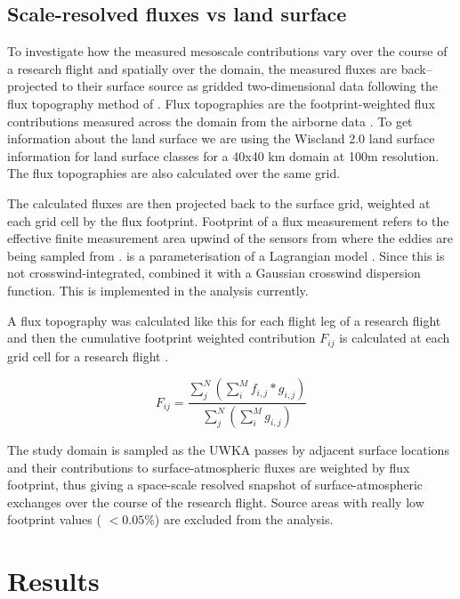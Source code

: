 \documentclass[draft]{agujournal2019}
\begin{document}
\subsection{Scale-resolved fluxes vs land surface}

To investigate how the measured mesoscale contributions vary over the course of a research flight and spatially over the domain,  the measured fluxes are back–projected to their surface source  as gridded two-dimensional data following the flux topography method of . Flux topographies are the footprint-weighted flux contributions measured across the domain from the airborne data \cite{amiro_footprint_1998}. To get information about the land surface we are using the Wiscland 2.0 land surface information for land surface classes for a 40x40 km domain at 100m resolution. The flux topographies are also calculated over the same grid.

The calculated fluxes are then projected back to the surface grid, weighted at each grid cell by the flux footprint. Footprint of a flux measurement refers to the effective finite measurement area upwind of the sensors from where the eddies are being sampled from \cite{foken_aspects_2006}.  is a parameterisation of a Lagrangian model \cite{kljun_three-dimensional_2002}. Since this is not crosswind-integrated,  combined it with a Gaussian crosswind dispersion function. This is implemented in the analysis currently.

A flux topography was calculated like this for each flight leg of a research flight and then the cumulative footprint weighted contribution $F_{ij}$ is calculated at each grid cell for a research flight \cite{kohnert_strong_2017}. 

 \begin{equation}
F_{ij} = \frac{\sum_{j}^{N}(\sum_{i}^{M}f_{i,j}*g_{i,j})}{\sum_{j}^{N}(\sum_{i}^{M}g_{i,j})}
 \end{equation}

The study domain is sampled as the UWKA passes by adjacent surface locations and their contributions to surface-atmospheric fluxes are weighted by flux footprint, thus giving a space-scale resolved snapshot of surface-atmospheric exchanges over the course of the research flight. Source areas with really low footprint values ( $ < 0.05\% $) are excluded from the analysis.  

\section{Results}
\end{document}
